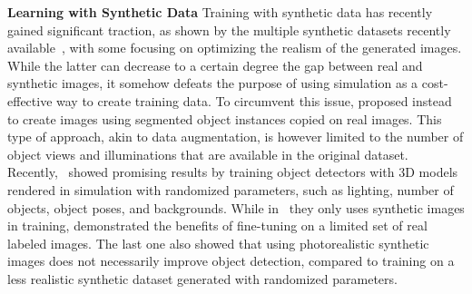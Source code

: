 \documentclass[letterpaper, 10 pt, conference]{ieeeconf}  %
\begin{document}
\textbf{Learning with Synthetic Data}
Training with synthetic data has recently gained significant traction, as shown by the multiple synthetic datasets recently available~\cite{gaidon2016virtual,mayer2016large,qiu2016unrealcv,ros2016synthia,johnson2017driving, richter2017playing}, with some focusing on optimizing the realism of the generated images. While the latter can decrease to a certain degree the gap between real and synthetic images, it somehow defeats the purpose of using simulation as a cost-effective way to create training data. To circumvent this issue, \cite{dwibedi2017cut,georgakis2017synthesizing} proposed instead to create images using segmented object instances copied on real images. This type of approach, akin to data augmentation, is however limited to the number of object views and illuminations that are available in the original dataset.
Recently,~\cite{hinterstoisser2017pre,tremblay2018training} showed promising results by training object detectors with 3D models rendered in simulation with randomized parameters, such as lighting, number of objects, object poses, and backgrounds. While in~\cite{hinterstoisser2017pre} they only uses synthetic images in training, \cite{tremblay2018training} demonstrated the benefits of fine-tuning on a limited set of real labeled images. The last one also showed that using photorealistic synthetic images does not necessarily improve object detection, compared to training on a less realistic synthetic dataset generated with randomized parameters.
\end{document}

